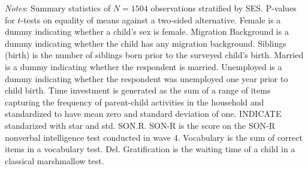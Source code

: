 \begin{table}[!htbp]
\begin{threeparttable}
\begin{tabular}[t]{lcccccc}
			\hline\hline
		\end{tabular}
	\begin{tablenotes}
		\small
		\item \textit{Notes}: Summary statistics of $N = 1504$ observations stratified by SES. P-values for $t$-tests on equality of means against a two-sided alternative. Female is a dummy indicating whether a child's sex is female. Migration Background is a dummy indicating whether the child has any migration background. Siblings (birth) is the number of siblings born prior to the surveyed child's birth. Married is a dummy indicating whether the respondent is married. Unemployed is a dummy indicating whether the respondent was unemployed one year prior to child birth. Time investment is generated as the sum of a range of items capturing the frequency of parent-child activities in the household and standardized to have mean zero and standard deviation of one. INDICATE standarized with star and std. SON.R. SON-R is the score on the SON-R nonverbal intelligence test conducted in wave 4. Vocabulary is the sum of correct items in a vocabulary test. Del. Gratification is the waiting time of a child in a classical marshmallow test.
	\end{tablenotes}
	\end{threeparttable}
\end{table}



%
%

